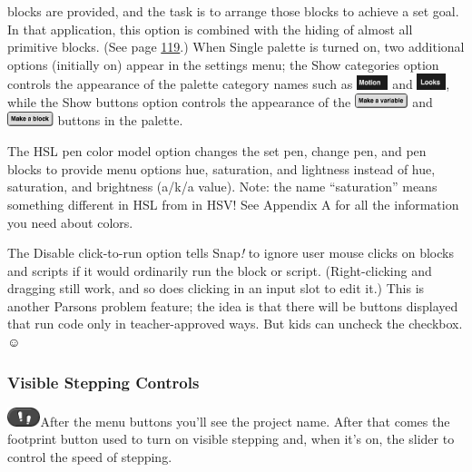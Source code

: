 blocks are provided, and the task is to arrange those blocks to achieve
a set goal. In that application, this option is combined with the hiding
of almost all primitive blocks. (See page
\hyperref[context-menus-for-palette-blocks]{119}.) When Single palette
is turned on, two additional options (initially on) appear in the
settings menu; the Show categories option controls the appearance of the
palette category names such as
\includegraphics[width=0.36in,height=0.16in]{media/image1029.png} and
\includegraphics[width=0.33in,height=0.18in]{media/image1030.png}, while
the Show buttons option controls the appearance of the
\includegraphics[width=0.61in,height=0.16in]{media/image1031.png} and
\includegraphics[width=0.53in,height=0.16in]{media/image1032.png}
buttons in the palette.

The HSL pen color model option changes the set pen, change pen, and pen
blocks to provide menu options hue, saturation, and lightness instead of
hue, saturation, and brightness (a/k/a value). Note: the name
``saturation'' means something different in HSL from in HSV! See
Appendix A for all the information you need about colors.

The Disable click-to-run option tells Snap\emph{!} to ignore user mouse
clicks on blocks and scripts if it would ordinarily run the block or
script. (Right-clicking and dragging still work, and so does clicking in
an input slot to edit it.) This is another Parsons problem feature; the
idea is that there will be buttons displayed that run code only in
teacher-approved ways. But kids can uncheck the checkbox. ☺︎

\subsubsection{Visible Stepping
Controls}\label{visible-stepping-controls}

\includegraphics[width=0.37917in,height=0.21667in]{media/image121.png}After
the menu buttons you'll see the project name. After that comes the
footprint button used to turn on visible stepping and, when it's on, the
slider to control the speed of stepping.

